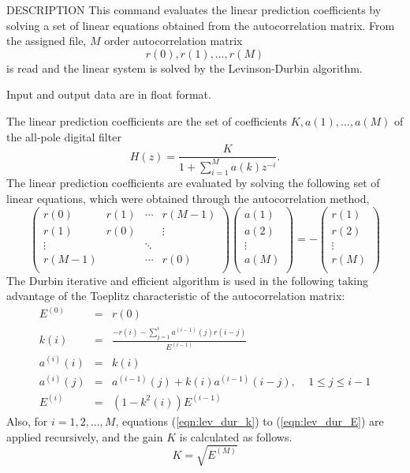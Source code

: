 \begin{qsection}{DESCRIPTION}
This command evaluates the linear prediction coefficients
by solving a set of linear equations obtained from
the autocorrelation matrix.
From the assigned file, $M$ order autocorrelation matrix
\begin{displaymath}
  r(0),r(1),\ldots,r(M)
\end{displaymath}
is read and the linear system is solved by the Levinson-Durbin
algorithm.
\par
Input and output data are in float format.
\par
The linear prediction coefficients are the set of coefficients
$K, a(1), \ldots, a(M)$ of the all-pole digital filter
\begin{displaymath}
H(z) = \frac{K}{\displaystyle{1+\sum_{i=1}^{M}a(k)z^{-i}}}.
\end{displaymath}
The linear prediction coefficients are evaluated by solving
the following set of linear equations, which were obtained
through the autocorrelation method,
\begin{displaymath}
\left( \begin{array}{cccc}
        r(0) & r(1) & \cdots & r(M-1) \\
        r(1) & r(0) &        & \vdots \\
        \vdots &    & \ddots &         \\
        r(M-1) &    & \cdots & r(0)   \\
        \end{array} \right)
\left( \begin{array}{c}
	a(1) \\
	a(2) \\
	\vdots \\
	a(M) \\
	\end{array} \right)
= - \left( \begin{array}{c}
	r(1) \\
	r(2) \\
	\vdots \\
	r(M) \\
	\end{array} \right)
\end{displaymath}
The Durbin iterative and efficient algorithm is used
in the following taking advantage of the Toeplitz characteristic
of the autocorrelation matrix:
\begin{eqnarray}
E^{(0)}    &=& r(0) \\
k(i)       &=& \frac{\displaystyle{-r(i)-\sum_{j=1}^i a^{(i-1)}(j)r(i-j)}}
		{E^{(i-1)}} \label{eqn:lev_dur_k}\\
a^{(i)}(i) &=& k(i) \\
a^{(i)}(j) &=&  a^{(i-1)}(j) + k(i) a^{(i-1)}(i-j), 
		~~~~~1\leq j \leq i-1\\
E^{(i)}    &=& (1-k^2(i)) E^{(i-1)} \label{eqn:lev_dur_E}
\end{eqnarray}
Also, for $i=1,2,\ldots,M$, equations (\ref{eqn:lev_dur_k}) to
 (\ref{eqn:lev_dur_E}) are applied recursively,
and the gain $K$ is calculated as follows.
\begin{displaymath}
K = \sqrt{E^{(M)}}
\end{displaymath}
\end{qsection}

